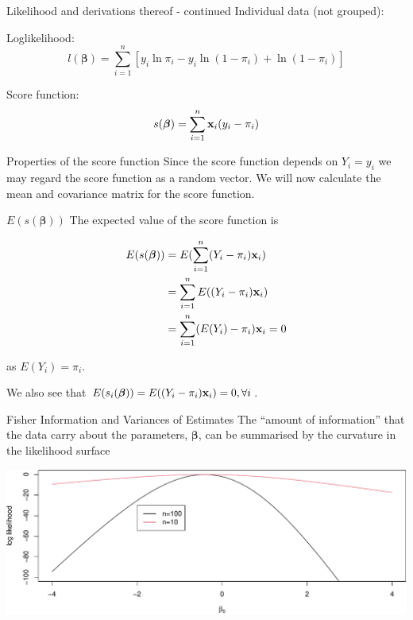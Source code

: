 \documentclass[
  ignorenonframetext,
]{beamer}
\begin{document}
\begin{frame}{Likelihood and derivations thereof - continued}
\protect\hypertarget{likelihood-and-derivations-thereof---continued}{}
Individual data (not grouped):

Loglikelihood:
\[l(\boldsymbol{\beta})=\sum_{i=1}^n[y_i \ln \pi_i-y_i\ln(1-\pi_i)+\ln(1-\pi_i)]\]

Score function:
\[s(\boldsymbol{\beta})=\sum_{i=1}^n {\bf x}_i (y_i-\pi_i)\]
\end{frame}

\begin{frame}
\begin{block}{Properties of the score function}
\protect\hypertarget{properties-of-the-score-function}{}
Since the score function depends on \(Y_i=y_i\) we may regard the score
function as a random vector. We will now calculate the mean and
covariance matrix for the score function.
\end{block}
\end{frame}

\begin{frame}
\begin{block}{\(E(s(\boldsymbol{\beta}))\)}
\protect\hypertarget{esboldsymbolbeta}{}
The expected value of the score function is

\[
\begin{aligned}
E(s(\boldsymbol{\beta})) &= E(\sum_{i=1}^n(Y_i-\pi_i){\bf x}_i) \\
&= \sum_{i=1}^nE((Y_i-\pi_i){\bf x}_i) \\
&= \sum_{i=1}^n(E(Y_i)-\pi_i){\bf x}_i = 0 \\
\end{aligned}
\]

as \(E(Y_i) = \pi_i\).

We also see that
\(E(s_i(\boldsymbol{\beta})) = E((Y_i-\pi_i){\bf x}_i) = 0, \forall i\).
\end{block}
\end{frame}

\begin{frame}
\begin{block}{Fisher Information and Variances of Estimates}
\protect\hypertarget{fisher-information-and-variances-of-estimates}{}
The ``amount of information'' that the data carry about the parameters,
\(\boldsymbol{\beta}\), can be summarised by the curvature in the
likelihood surface

\includegraphics{Module03BinRegPresentationWeek2_files/figure-beamer/Curvature-1.pdf}
\end{block}
\end{frame}
\end{document}
